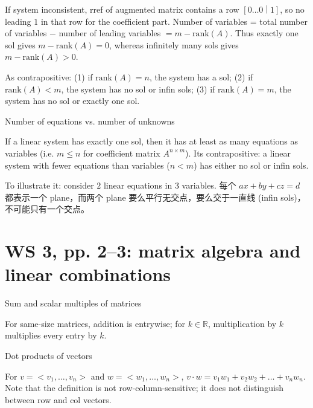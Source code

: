 If system inconsistent, rref of augmented matrix contains a row \(\left\lbrack 0\ldots 0 \middle| 1 \right\rbrack\), so no leading \(1\) in that row for the coefficient part. Number of variables = total number of variables \(-\) number of leading variables \(= m - \text{rank}(A)\). Thus exactly one sol gives \(m - \text{rank}(A) = 0\), whereas infinitely many sols gives \(m - \text{rank}(A) > 0\).

As contrapositive: (1) if \(\text{rank}(A) = n\), the system has a sol; (2) if \(\text{rank}(A) < m\), the system has no sol or infin sols; (3) if \(\text{rank}(A) = m\), the system has no sol or exactly one sol.

\begin{theorem}{Number of equations vs. number of unknowns}

If a linear system has exactly one sol, then it has at least as many equations as variables (i.e. \(m \leq n\) for coefficient matrix \(A^{n \times m}\)). Its contrapositive: a linear system with fewer equations than variables (\(n < m\)) has either no sol or infin sols.

\end{theorem}

To illustrate it: consider \(2\) linear equations in \(3\) variables. 每个 \(ax + by + cz = d\) 都表示一个 plane，而两个 plane 要么平行无交点，要么交于一直线 (infin sols)，不可能只有一个交点。

\section{WS 3, pp. 2--3: matrix algebra and linear combinations}

\begin{definition}{Sum and scalar multiples of matrices}

For same-size matrices, addition is entrywise; for \(k \in \mathbb{R}\), multiplication by \(k\) multiplies every entry by \(k\).

\end{definition}

\begin{definition}{Dot products of vectors}

For \(v = < v_{1},\ldots,v_{n} >\) and \(w = < w_{1},\ldots,w_{n} >\), \(v \cdot w = v_{1}w_{1} + v_{2}w_{2} + \ldots + v_{n}w_{n}\). Note that the definition is not row-column-sensitive; it does not distinguish between row and col vectors.

\end{definition}

